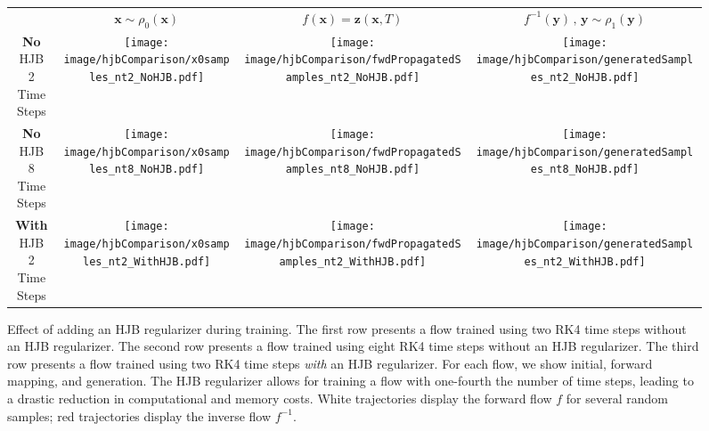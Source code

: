 \documentclass[letterpaper]{article}
\newcommand{\bfx}{\boldsymbol{x}}
\newcommand{\bfy}{\boldsymbol{y}}
\newcommand{\bfz}{\boldsymbol{z}}
\begin{document}
\newcommand{\rottext}[1]{\rotatebox{90}{\parbox{35mm}{\centering #1 }}}
\begin{figure}[t!]
  \centering
  \addtolength{\tabcolsep}{-3pt} %
  \begin{tabular}{cccc}
  & $\bfx \sim \rho_0(\bfx)$ & $f(\bfx) = \bfz(\bfx,T)$ & $f^{-1}(\bfy) \, , \, \bfy \sim \rho_1(\bfy)$
  \\
  \rottext{\textbf{No} HJB \\ 2 Time Steps}
  &
  \texttt{[image: image/hjbComparison/x0samples\_nt2\_NoHJB.pdf]}
  &
  \texttt{[image: image/hjbComparison/fwdPropagatedSamples\_nt2\_NoHJB.pdf]}
  &
  \texttt{[image: image/hjbComparison/generatedSamples\_nt2\_NoHJB.pdf]}
  \\ 
  \rottext{\textbf{No} HJB \\ 8 Time Steps} 
  &
  \texttt{[image: image/hjbComparison/x0samples\_nt8\_NoHJB.pdf]}
  &
  \texttt{[image: image/hjbComparison/fwdPropagatedSamples\_nt8\_NoHJB.pdf]}
  &
  \texttt{[image: image/hjbComparison/generatedSamples\_nt8\_NoHJB.pdf]}
  \\ 
  \rottext{\textbf{With} HJB \\ 2 Time Steps} 
  &
  \texttt{[image: image/hjbComparison/x0samples\_nt2\_WithHJB.pdf]}
  &
  \texttt{[image: image/hjbComparison/fwdPropagatedSamples\_nt2\_WithHJB.pdf]}
  &
  \texttt{[image: image/hjbComparison/generatedSamples\_nt2\_WithHJB.pdf]}
  \end{tabular}
  \caption{Effect of adding an HJB regularizer during training. 
  The first row presents a flow trained using two RK4 time steps without an HJB regularizer.
  The second row presents a flow trained using eight RK4 time steps without an HJB regularizer.
  The third row presents a flow trained using two RK4 time steps \emph{with} an HJB regularizer.
  For each flow, we show initial, forward mapping, and generation.
  The HJB regularizer allows for training a flow with one-fourth the number of time steps, leading to a drastic reduction in computational and memory costs. White trajectories display the forward flow $f$ for several random samples; red trajectories display the inverse flow $f^{-1}$.}
  \label{fig:effectOfHJBReg}
  \addtolength{\tabcolsep}{3pt} %
\end{figure}
\end{document}
